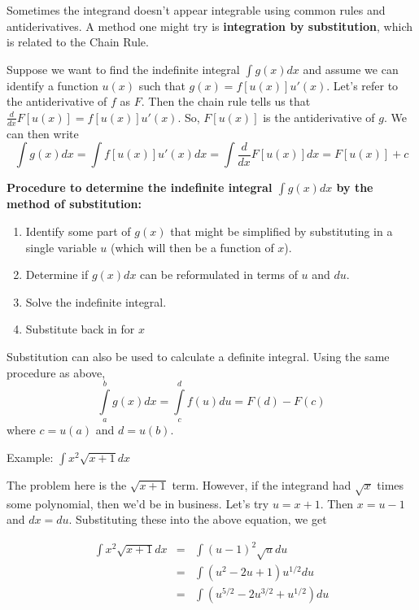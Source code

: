 \documentclass[]{book}
\providecommand{\tightlist}{%
  \setlength{\itemsep}{0pt}\setlength{\parskip}{0pt}}
\theoremstyle{definition}
\theoremstyle{definition}
\theoremstyle{definition}
\theoremstyle{remark}
\begin{document}
Sometimes the integrand doesn't appear integrable using common rules and
antiderivatives. A method one might try is \textbf{integration by
substitution}, which is related to the Chain Rule.

Suppose we want to find the indefinite integral \(\int g(x)dx\) and
assume we can identify a function \(u(x)\) such that
\(g(x)=f[u(x)]u'(x)\). Let's refer to the antiderivative of \(f\) as
\(F\). Then the chain rule tells us that
\(\frac{d}{dx} F[u(x)]=f[u(x)]u'(x)\). So, \(F[u(x)]\) is the
antiderivative of \(g\). We can then write
\[\int g(x) dx= \int f[u(x)]u'(x)dx = \int \frac{d}{dx} F[u(x)]dx = F[u(x)]+c\]

\textbf{Procedure to determine the indefinite integral \(\int g(x)dx\)
by the method of substitution:}

\begin{enumerate}
\def\labelenumi{\arabic{enumi}.}
\tightlist
\item
  Identify some part of \(g(x)\) that might be simplified by
  substituting in a single variable \(u\) (which will then be a function
  of \(x\)).
\item
  Determine if \(g(x)dx\) can be reformulated in terms of \(u\) and
  \(du\).
\item
  Solve the indefinite integral.
\item
  Substitute back in for \(x\)
\end{enumerate}

Substitution can also be used to calculate a definite integral. Using
the same procedure as above,
\[\int\limits_a^b g(x)dx=\int\limits_c^d f(u)du = F(d)-F(c)\] where
\(c=u(a)\) and \(d=u(b)\).

Example: \(\int x^2 \sqrt{x+1}dx\)

\vspace{6pt}

The problem here is the \(\sqrt{x+1}\) term. However, if the integrand
had \(\sqrt{x}\) times some polynomial, then we'd be in business. Let's
try \(u=x+1\). Then \(x=u-1\) and \(dx=du\). Substituting these into the
above equation, we get

\begin{eqnarray}
            \int x^2\sqrt{x+1}dx&=&\int (u-1)^2\sqrt{u}du\nonumber\\
            &=&\int (u^2-2u+1)u^{1/2}du\nonumber\\
            &=&\int (u^{5/2}-2u^{3/2}+u^{1/2})du\nonumber
\end{eqnarray}
\end{document}
